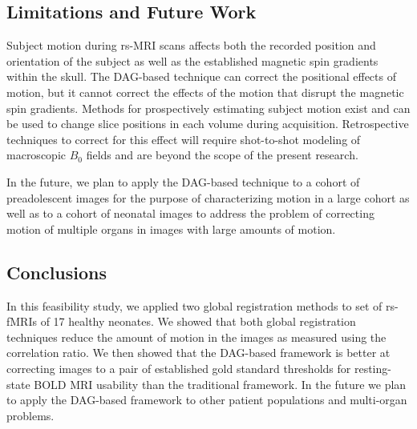 \subsection{Limitations and Future Work}

Subject motion during rs-MRI scans affects both the recorded position and orientation of the subject as well as the established magnetic spin gradients within the skull. The DAG-based technique can correct the positional effects of motion, but it cannot correct the effects of the motion that disrupt the magnetic spin gradients. Methods for prospectively estimating subject motion exist and can be used to change slice positions in each volume during acquisition. Retrospective techniques to correct for this effect will require shot-to-shot modeling of macroscopic $B_0$ fields and are beyond the scope of the present research.

In the future, we plan to apply the DAG-based technique to a cohort of preadolescent images for the purpose of characterizing motion in a large cohort as well as to a cohort of neonatal images to address the problem of correcting motion of multiple organs in images with large amounts of motion.  

\subsection{Conclusions}

In this feasibility study, we applied two global registration methods to set of rs-fMRIs of 17 healthy neonates. We showed that both global registration techniques reduce the amount of motion in the images as measured using the correlation ratio. We then showed that the DAG-based framework is better at correcting images to a pair of established gold standard thresholds for resting-state BOLD MRI usability than the traditional framework. In the future we plan to apply the DAG-based framework to other patient populations and multi-organ problems.